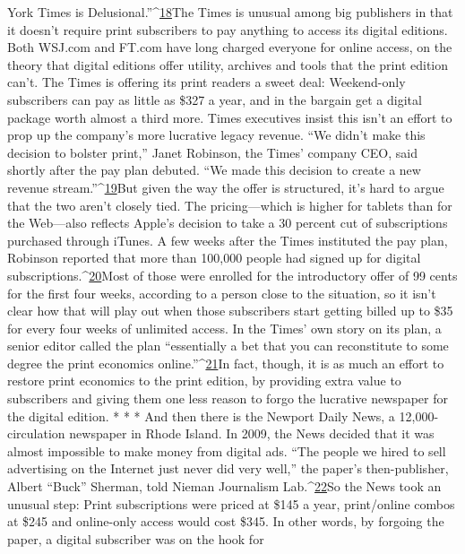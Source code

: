 York Times is Delusional.''^{\href{#endnotes-chapter-5}{18}}The Times is unusual among big publishers in that it doesn't require print subscribers
to pay anything to access its digital editions. Both WSJ.com and FT.com
have long charged everyone for online access, on the theory that digital editions
offer utility, archives and tools that the print edition can't. The Times is offering
its print readers a sweet deal: Weekend-only subscribers can pay as little as \$327
a year, and in the bargain get a digital package worth almost a third more. Times
executives insist this isn't an effort to prop up the company's more lucrative
legacy revenue. ``We didn't make this decision to bolster print,'' Janet Robinson,
the Times' company CEO, said shortly after the pay plan debuted. ``We made
this decision to create a new revenue stream.''^{\href{#endnotes-chapter-5}{19}}But given the way the offer is
structured, it's hard to argue that the two aren't closely tied. The pricing—which
is higher for tablets than for the Web—also reflects Apple's decision to take a 30
percent cut of subscriptions purchased through iTunes.
A few weeks after the Times instituted the pay plan, Robinson reported that
more than 100,000 people had signed up for digital subscriptions.^{\href{#endnotes-chapter-5}{20}}Most of
those were enrolled for the introductory offer of 99 cents for the first four weeks,
according to a person close to the situation, so it isn't clear how that will play
out when those subscribers start getting billed up to \$35 for every four weeks of
unlimited access.
In the Times' own story on its plan, a senior editor called the plan ``essentially
a bet that you can reconstitute to some degree the print economics online.''^{\href{#endnotes-chapter-5}{21}}In
fact, though, it is as much an effort to restore print economics to the print edition,
by providing extra value to subscribers and giving them one less reason to
forgo the lucrative newspaper for the digital edition.
* * *
And then there is the Newport Daily News, a 12,000-circulation newspaper
in Rhode Island.
In 2009, the News decided that it was almost impossible to make money
from digital ads. ``The people we hired to sell advertising on the Internet just
never did very well,'' the paper's then-publisher, Albert ``Buck'' Sherman, told
Nieman Journalism Lab.^{\href{#endnotes-chapter-5}{22}}So the News took an unusual step: Print subscriptions
were priced at \$145 a year, print/online combos at \$245 and online-only
access would cost \$345.
In other words, by forgoing the paper, a digital subscriber was on the hook for
